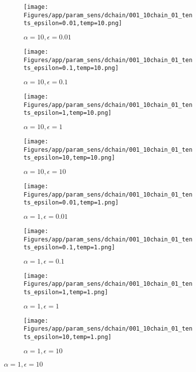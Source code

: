 \documentclass{article}
\theoremstyle{plain}
\begin{document}
\begin{appendices}
\begin{figure}
                \begin{subfigure}[b]{0.24\textwidth}
                    \centering
                    \texttt{[image: Figures/app/param\_sens/dchain/001\_10chain\_01\_tents\_epsilon=0.01,temp=10.png]}
                    \caption*{$\alpha=10,\epsilon=0.01$}
                \end{subfigure}
                \begin{subfigure}[b]{0.24\textwidth}
                    \centering
                    \texttt{[image: Figures/app/param\_sens/dchain/001\_10chain\_01\_tents\_epsilon=0.1,temp=10.png]}
                    \caption*{$\alpha=10,\epsilon=0.1$}
                \end{subfigure}
                \begin{subfigure}[b]{0.24\textwidth}
                    \centering
                    \texttt{[image: Figures/app/param\_sens/dchain/001\_10chain\_01\_tents\_epsilon=1,temp=10.png]}
                    \caption*{$\alpha=10,\epsilon=1$}
                \end{subfigure}
                \begin{subfigure}[b]{0.24\textwidth}
                    \centering
                    \texttt{[image: Figures/app/param\_sens/dchain/001\_10chain\_01\_tents\_epsilon=10,temp=10.png]}
                    \caption*{$\alpha=10,\epsilon=10$}
                \end{subfigure}
                
                \begin{subfigure}[b]{0.24\textwidth}
                    \centering
                    \texttt{[image: Figures/app/param\_sens/dchain/001\_10chain\_01\_tents\_epsilon=0.01,temp=1.png]}
                    \caption*{$\alpha=1,\epsilon=0.01$}
                \end{subfigure}
                \begin{subfigure}[b]{0.24\textwidth}
                    \centering
                    \texttt{[image: Figures/app/param\_sens/dchain/001\_10chain\_01\_tents\_epsilon=0.1,temp=1.png]}
                    \caption*{$\alpha=1,\epsilon=0.1$}
                \end{subfigure}
                \begin{subfigure}[b]{0.24\textwidth}
                    \centering
                    \texttt{[image: Figures/app/param\_sens/dchain/001\_10chain\_01\_tents\_epsilon=1,temp=1.png]}
                    \caption*{$\alpha=1,\epsilon=1$}
                \end{subfigure}
                \begin{subfigure}[b]{0.24\textwidth}
                    \centering
                    \texttt{[image: Figures/app/param\_sens/dchain/001\_10chain\_01\_tents\_epsilon=10,temp=1.png]}
                    \caption*{$\alpha=1,\epsilon=10$}
                \end{subfigure}
                

\end{figure}
\end{appendices}
\end{document}
